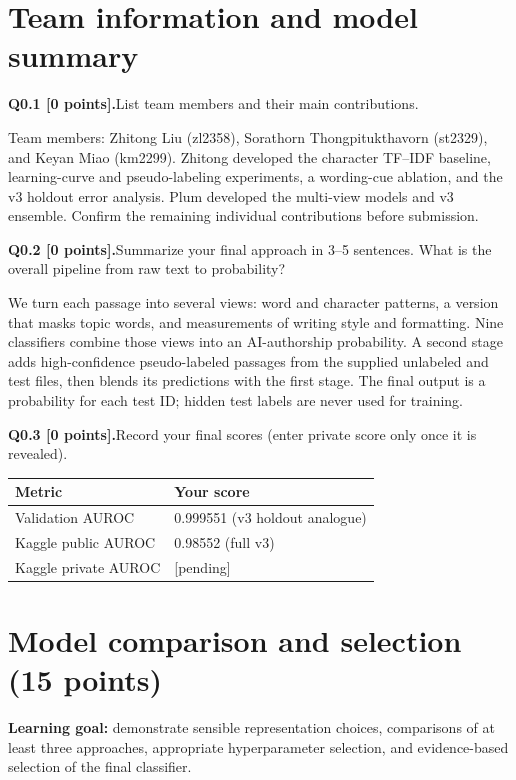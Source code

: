 \documentclass[11pt,letterpaper]{article}
\newcommand{\question}[2]{\needspace{4\baselineskip}\par\addvspace{0.45em}\noindent\textbf{#1}\quad #2\par\nobreak\vspace{0.1em}}
\begin{document}
\section{Team information and model summary}
\question{Q0.1 [0 points].}{List team members and their main contributions.}
Team members: Zhitong Liu (zl2358), Sorathorn Thongpitukthavorn (st2329), and Keyan Miao (km2299). Zhitong developed the character TF--IDF baseline, learning-curve and pseudo-labeling experiments, a wording-cue ablation, and the v3 holdout error analysis. Plum developed the multi-view models and v3 ensemble. Confirm the remaining individual contributions before submission.
\question{Q0.2 [0 points].}{Summarize your final approach in 3--5 sentences. What is the overall pipeline from raw text to probability?}
We turn each passage into several views: word and character patterns, a version that masks topic words, and measurements of writing style and formatting. Nine classifiers combine those views into an AI-authorship probability. A second stage adds high-confidence pseudo-labeled passages from the supplied unlabeled and test files, then blends its predictions with the first stage. The final output is a probability for each test ID; hidden test labels are never used for training.
\question{Q0.3 [0 points].}{Record your final scores (enter private score only once it is revealed).}
\begin{tabularx}{\linewidth}{@{}Yp{1.8in}@{}}\toprule Metric & Your score \\ \midrule Validation AUROC & 0.999551 (v3 holdout analogue) \\ Kaggle public AUROC & 0.98552 (full v3) \\ Kaggle private AUROC & [pending] \\ \bottomrule\end{tabularx}
\newpage
\section{Model comparison and selection (15 points)}
\textbf{Learning goal:} demonstrate sensible representation choices, comparisons of at least three approaches, appropriate hyperparameter selection, and evidence-based selection of the final classifier.
\end{document}
